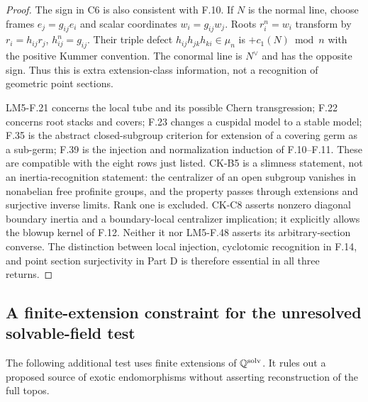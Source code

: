 \begin{proof}
The sign in C6 is also consistent with F.10. If $N$ is the normal
line, choose frames $e_j=g_{ij}e_i$ and scalar coordinates
$w_i=g_{ij}w_j$. Roots $r_i^n=w_i$ transform by
$r_i=h_{ij}r_j$, $h_{ij}^n=g_{ij}$. Their triple defect
$h_{ij}h_{jk}h_{ki}\in\mu_n$ is $+c_1(N)\bmod n$ with the
positive Kummer convention. The conormal line is $N^\vee$ and has
the opposite sign. Thus this is extra extension-class information,
not a recognition of geometric point sections.

LM5-F.21 concerns the local tube and its possible Chern
transgression; F.22 concerns root stacks and covers; F.23 changes a
cuspidal model to a stable model; F.35 is the abstract closed-subgroup
criterion for extension of a covering germ as a sub-germ; F.39 is
the injection and normalization induction of F.10--F.11. These are
compatible with the eight rows just listed. CK-B5 is a slimness
statement, not an inertia-recognition statement: the centralizer
of an open subgroup vanishes in nonabelian free profinite groups,
and the property passes through extensions and surjective inverse
limits. Rank one is excluded. CK-C8 asserts nonzero diagonal
boundary inertia and a boundary-local centralizer implication;
it explicitly allows the blowup kernel of F.12. Neither it nor
LM5-F.48 asserts its arbitrary-section converse. The distinction
between local injection, cyclotomic recognition in F.14, and point
section surjectivity in Part D is therefore essential in all three
returns.
\end{proof}

\subsection{A finite-extension constraint for the unresolved solvable-field test}

The following additional test uses finite extensions of
$\mathbb Q^{\mathrm{solv}}$. It rules out a proposed source of exotic
endomorphisms without asserting reconstruction of the full topos.


